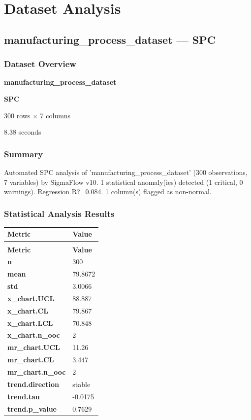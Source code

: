 \documentclass[12pt,a4paper]{article}
\begin{document}
\newpage

\section{Dataset Analysis}

\subsection{manufacturing\_process\_dataset — SPC}
\subsubsection*{Dataset Overview}
\begin{description}[leftmargin=3.5cm, style=nextline]
  \item[Dataset]    \textbf{manufacturing\_process\_dataset}
  \item[Type]       \textbf{SPC}
  \item[Dimensions] 300 rows \(\times\) 7 columns
  \item[Processing] 8.38 seconds
\end{description}
\subsubsection*{Summary}
Automated SPC analysis of 'manufacturing\_process\_dataset' (300 observations, 7 variables) by SigmaFlow v10. 1 statistical anomaly(ies) detected (1 critical, 0 warnings). Regression R?=0.084. 1 column(s) flagged as non-normal.
\subsubsection*{Statistical Analysis Results}
\begin{longtable}{>{\bfseries}p{6.5cm} p{8.5cm}}
\toprule \textbf{Metric} & \textbf{Value} \\ \midrule
\endfirsthead
\multicolumn{2}{c}{\small(continued)} \\
\toprule \textbf{Metric} & \textbf{Value} \\ \midrule
\endhead
  n & 300 \\
  mean & 79.8672 \\
  std & 3.0066 \\
  x\_chart.UCL & 88.887 \\
  x\_chart.CL & 79.867 \\
  x\_chart.LCL & 70.848 \\
  x\_chart.n\_ooc & 2 \\
  mr\_chart.UCL & 11.26 \\
  mr\_chart.CL & 3.447 \\
  mr\_chart.n\_ooc & 2 \\
  trend.direction & stable \\
  trend.tau & -0.0175 \\
  trend.p\_value & 0.7629 \\
\bottomrule
\end{longtable}
\end{document}
